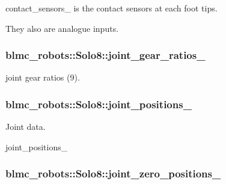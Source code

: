 contact\+\_\+sensors\+\_\+ is the contact sensors at each foot tips. 

They also are analogue inputs. 
\subsubsection[{\texorpdfstring{joint\+\_\+gear\+\_\+ratios\+\_\+}{joint_gear_ratios_}}]{ blmc\+\_\+robots\+::\+Solo8\+::joint\+\_\+gear\+\_\+ratios\+\_\+\hspace{0.3cm}{\ttfamily [private]}}\hypertarget{classblmc__robots_1_1Solo8_a09ab41c9822e1f1c853d0b9065205d2d}{}\label{classblmc__robots_1_1Solo8_a09ab41c9822e1f1c853d0b9065205d2d}


joint gear ratios (9). 

\subsubsection[{\texorpdfstring{joint\+\_\+positions\+\_\+}{joint_positions_}}]{ blmc\+\_\+robots\+::\+Solo8\+::joint\+\_\+positions\+\_\+\hspace{0.3cm}{\ttfamily [private]}}\hypertarget{classblmc__robots_1_1Solo8_a2a731cc04e539d6fde3c3e5cd6922a42}{}\label{classblmc__robots_1_1Solo8_a2a731cc04e539d6fde3c3e5cd6922a42}


Joint data. 

joint\+\_\+positions\+\_\+ 
\subsubsection[{\texorpdfstring{joint\+\_\+zero\+\_\+positions\+\_\+}{joint_zero_positions_}}]{ blmc\+\_\+robots\+::\+Solo8\+::joint\+\_\+zero\+\_\+positions\+\_\+\hspace{0.3cm}{\ttfamily [private]}}\hypertarget{classblmc__robots_1_1Solo8_a31f29f1bf604552b2ae5d017e5f3e2d1}{}\label{classblmc__robots_1_1Solo8_a31f29f1bf604552b2ae5d017e5f3e2d1}


